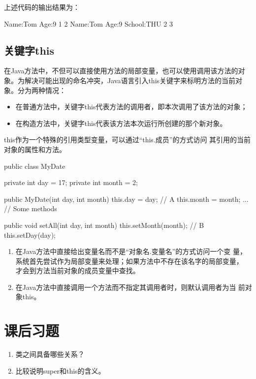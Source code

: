 上述代码的输出结果为：

\begin{stdoutCode}
  Name:Tom Age:9
  1
  2
  Name:Tom Age:9 School:THU
  2
  3  
\end{stdoutCode}

\subsection{关键字this}

在Java方法中，不但可以直接使用方法的局部变量，也可以使用调用该方法的对
象。为解决可能出现的命名冲突，Java语言引入this关键字来标明方法的当前对
象。分为两种情况：

\begin{itemize}
\item 在普通方法中，关键字this代表方法的调用者，即本次调用了该方法的对象；
\item 在构造方法中，关键字this代表该方法本次运行所创建的那个新对象。
\end{itemize}

this作为一个特殊的引用类型变量，可以通过“{\Red this.成员}”的方式访问
其引用的当前对象的属性和方法。

\begin{javaCode}
  public class MyDate {
    private int day = 17;
    private int month = 2;

    public MyDate(int day, int month) {
      this.day = day; // A
      this.month = month;
    }
    ... // Some methods 

    public void setAll(int day, int month) {
      this.setMonth(month); // B
      this.setDay(day);
    }
  }
\end{javaCode}


\begin{enumerate}
\item 在Java方法中直接给出变量名而不是“对象名.变量名”的方式访问一个变
  量，系统首先尝试作为局部变量来处理；如果方法中不存在该名字的局部变量，
  才会到方法当前对象的成员变量中查找。
\item 在Java方法中直接调用一个方法而不指定其调用者时，则默认调用者为当
  前对象this。
\end{enumerate}

\section{课后习题}

\begin{enumerate}
\item 类之间具备哪些关系？
\item 比较说明super和this的含义。
\end{enumerate}